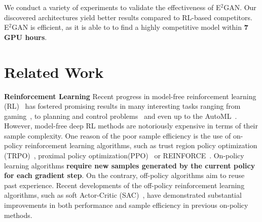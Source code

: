 \documentclass[runningheads]{llncs}
\begin{document}
We conduct a variety of experiments to validate the effectiveness of E$^2$GAN. Our discovered architectures yield better results compared to RL-based competitors. E$^2$GAN is efficient, as it is able to to find a highly competitive model within \textbf{7 GPU hours}.

\section{Related Work}


\textbf{Reinforcement Learning}
Recent progress in model-free reinforcement learning (RL)~\cite{sutton1992reinforcement} has fostered promising results in many interesting tasks ranging from gaming~\cite{mnih2013playing,silver2014deterministic}, to planning and control problems~\cite{hwangbo2019learning,kumar2016learning,xie2019iterative,han2019h_,chao2020real,han2020actor} and even up to the AutoML~\cite{zoph2016neural,pham2018efficient,liu2018progressive}. However, model-free deep RL methods are notoriously expensive in terms of their sample complexity. One reason of the poor sample efficiency is the use of on-policy reinforcement learning algorithms, such as trust region policy optimization (TRPO)~\cite{schulman2015trust}, proximal policy optimization(PPO)~\cite{schulman2017proximal}  or REINFORCE~\cite{williams1992simple}. On-policy learning algorithms \textbf{require new samples generated by the current policy for each gradient step}. On the contrary, off-policy algorithms aim to reuse past experience. Recent developments of the off-policy reinforcement learning algorithms, such as soft Actor-Critic (SAC)~\cite{haarnoja2018soft}, have demonstrated substantial improvements in both performance and sample efficiency in previous on-policy methods.
\end{document}
